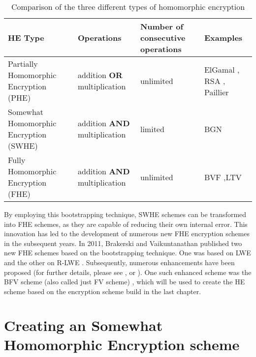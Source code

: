 \begin{table}
  \caption{Comparison of the three different types of homomorphic encryption}
  \label{table:HeTypeComparison}
  \begin{tabular}{|p{5cm}|p{2.8cm}|p{2.1cm}|p{3cm}|}
    \toprule
    HE Type                                         & Operations                           & Number of consecutive operations & Examples                                                                           \\
    \midrule
    Partially Homomorphic \newline Encryption (PHE) & addition \textbf{OR} multiplication  & unlimited                        & ElGamal \cite{ElGamal}, \newline RSA \cite{RSA}, \newline Paillier \cite{Paillier} \\
    \midrule
    Somewhat Homomorphic \newline Encryption (SWHE) & addition \textbf{AND} multiplication & limited                          & BGN \cite{BGN}                                                                     \\
    \midrule
    Fully Homomorphic \newline Encryption (FHE)     & addition \textbf{AND} multiplication & unlimited                        & BVF \cite{bfv},\newline LTV \cite{LTV}                                             \\
    \bottomrule
  \end{tabular}
\end{table}

By employing this bootstrapping technique, SWHE schemes can be transformed into FHE schemes, as they are capable of reducing their own internal error. This innovation has led to the development of numerous new FHE encryption schemes in the subsequent years. In 2011, Brakerski and Vaikuntanathan published two new FHE schemes based on the bootstrapping technique. One was based on LWE \cite{FirstLweFHE} and the other on R-LWE \cite{FirstRLweFHE}. Subsequently, numerous enhancements have been proposed (for further details, please see \cite{SurveyOfHomomorphicEncryption}, \cite{FheImplementations} or \cite{FHESurvey}). One such enhanced scheme was the BFV scheme (also called just FV scheme) \cite{bfv}, which will be used to create the HE scheme based on the encryption scheme build in the last chapter.


\section{Creating an Somewhat Homomorphic Encryption scheme}

